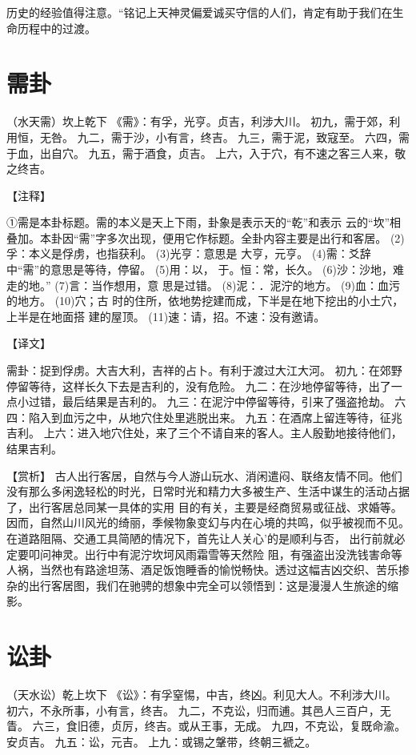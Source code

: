 \documentclass[a4paper,12pt,UTF8,twoside]{ctexbook}
\begin{document}
历史的经验值得注意。“铭记上天神灵偏爱诚买守信的人们，肯定有助于我们在生命历程中的过渡。

\chapter{需卦}

（水天需）坎上乾下
《需》：有孚，光亨。贞吉，利涉大川。
初九，需于郊，利用恒，无咎。
九二，需于沙，小有言，终吉。
九三，需于泥，致寇至。
六四，需于血，出自穴。
九五，需于酒食，贞吉。
上六，入于穴，有不速之客三人来，敬之终吉。

【注释】

①需是本卦标题。需的本义是天上下雨，卦象是表示天的“乾”和表示 云的“坎”相叠加。本卦因“需”字多次出现，便用它作标题。全卦内容主要是出行和客居。
(2)孚：本义是俘虏，也指获利。
(3)光亨：意思是 大亨，元亨。
(4)需：爻辞中“需”的意思是等待，停留。
(5)用：以， 于。恒：常，长久。
(6)沙：沙地，难走的地。”
(7)言：当作想用，意 思是过错。
(8)泥：．泥泞的地方。
(9)血：血污的地方。
(10)穴；古 时的住所，依地势挖建而成，下半是在地下挖出的小土穴，上半是在地面搭 建的屋顶。
(11)速：请，招。不速：没有邀请。

【译文】

需卦：捉到俘虏。大吉大利，吉祥的占卜。有利于渡过大江大河。
初九：在郊野停留等待，这样长久下去是吉利的，没有危险。
九二：在沙地停留等待，出了一点小过错，最后结果是吉利的。
九三：在泥泞中停留等待，引来了强盗抢劫。
六四：陷入到血污之中，从地穴住处里逃脱出来。
九五：在酒席上留连等待，征兆吉利。
上六：进入地穴住处，来了三个不请自来的客人。主人殷勤地接待他们，结果吉利。

【赏析】
古人出行客居，自然与今人游山玩水、消闲遣闷、联络友情不同。他们没有那么多闲逸轻松的时光，日常时光和精力大多被生产、生活中谋生的活动占据了，出行客居总同某一具体的实用 目的有关，主要是经商贸易或征战、求婚等。因而，自然山川风光的绮丽，季候物象变幻与内在心境的共鸣，似乎被视而不见。在道路阻隔、交通工具简陋的情况下，首先让人关心’的是顺利与否， 出行前就必定要叩问神灵。出行中有泥泞坎坷风雨霜雪等天然险 阻，有强盗出没洗钱害命等人祸，当然也有路途坦荡、酒足饭饱睡香的愉悦畅快。透过这幅吉凶交织、苦乐掺杂的出行客居图，我们在驰骋的想象中完全可以领悟到：这是漫漫人生旅途的缩影。 

\chapter{讼卦}

（天水讼）乾上坎下
《讼》：有孚窒惕，中吉，终凶。利见大人。不利涉大川。
初六，不永所事，小有言，终吉。
九二，不克讼，归而逋。其邑人三百户，无眚。
六三，食旧德，贞厉，终吉。或从王事，无成。
九四，不克讼，复既命渝。安贞吉。
九五：讼，元吉。
上九：或锡之鞶带，终朝三褫之。
\end{document}

